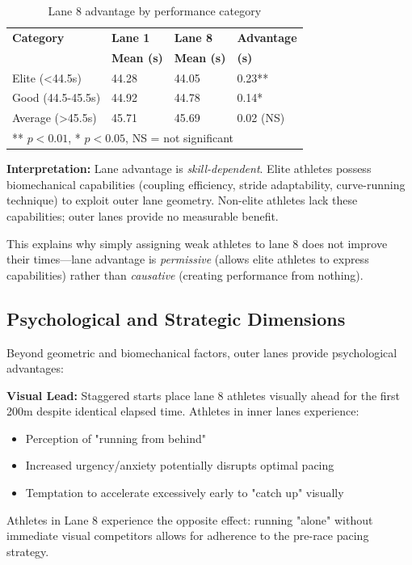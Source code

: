 \begin{table}[H]
\centering
\caption{Lane 8 advantage by performance category}
\begin{tabular}{@{}llll@{}}
\toprule
\textbf{Category} & \textbf{Lane 1} & \textbf{Lane 8} & \textbf{Advantage} \\
 & \textbf{Mean (s)} & \textbf{Mean (s)} & \textbf{(s)} \\
\midrule
Elite (<44.5s) & 44.28 & 44.05 & 0.23** \\
Good (44.5-45.5s) & 44.92 & 44.78 & 0.14* \\
Average (>45.5s) & 45.71 & 45.69 & 0.02 (NS) \\
\bottomrule
\multicolumn{4}{l}{\small{** $p < 0.01$, * $p < 0.05$, NS = not significant}}
\end{tabular}
\end{table}

\textbf{Interpretation:} Lane advantage is \textit{skill-dependent}. Elite athletes possess biomechanical capabilities (coupling efficiency, stride adaptability, curve-running technique) to exploit outer lane geometry. Non-elite athletes lack these capabilities; outer lanes provide no measurable benefit.

This explains why simply assigning weak athletes to lane 8 does not improve their times—lane advantage is \textit{permissive} (allows elite athletes to express capabilities) rather than \textit{causative} (creating performance from nothing).

\subsection{Psychological and Strategic Dimensions}

Beyond geometric and biomechanical factors, outer lanes provide psychological advantages:

\textbf{Visual Lead:} Staggered starts place lane 8 athletes visually ahead for the first 200m despite identical elapsed time. Athletes in inner lanes experience:
\begin{itemize}
    \item Perception of "running from behind"
    \item Increased urgency/anxiety potentially disrupts optimal pacing
    \item Temptation to accelerate excessively early to "catch up" visually
\end{itemize}

Athletes in Lane 8 experience the opposite effect: running "alone" without immediate visual competitors allows for adherence to the pre-race pacing strategy.

